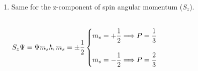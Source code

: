\documentclass[fleqn]{article}
\begin{document}
\begin{enumerate}
\begin{enumerate}
      \item Same for the z-component of spin angular momentum ($S_z$).

        \textcolor{hwColor}{
          \\
          $
            S_z \Psi=\Psi m_s \hbar, m_s=\pm\dfrac{1}{2}
            \\
            \\
            \begin{cases}
              m_s=+\dfrac{1}{2} \Longrightarrow P=\dfrac{1}{3}
              \\
              \\
              m_s=-\dfrac{1}{2} \Longrightarrow P=\dfrac{2}{3}
            \end{cases}
            \\
          $
        }

    \end{enumerate}
    

  \end{enumerate}
\end{document}
